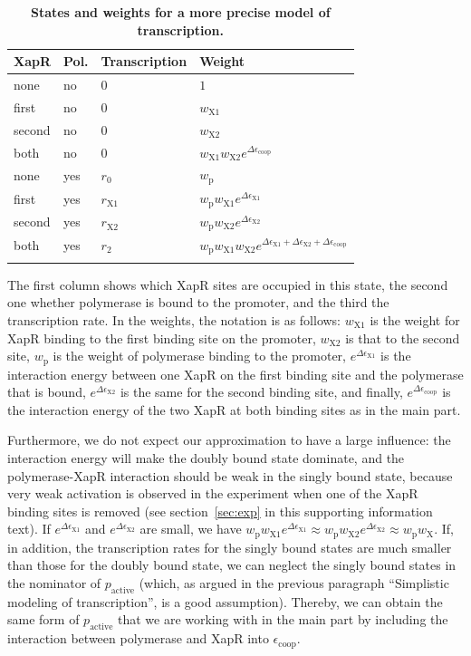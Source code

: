 \documentclass[10pt,letterpaper]{article}
\newlength\savedwidth
\newcommand\thickhline{\noalign{\global\savedwidth\arrayrulewidth\global\arrayrulewidth 2pt}%
	\hline
	\noalign{\global\arrayrulewidth\savedwidth}}
\newcommand{\n}[1]{\mathrm{#1}}
\begin{document}
\begin{table}
	\centering
	\caption{
		{\bf States and weights for a more precise model of transcription.}}
	\begin{tabular}{llll}
		\thickhline
		XapR & Pol. & Transcription & Weight \\
		\hline
		none & no & $0$ & $1$ \\
		first & no & $0$ & $w_{\n{X1}}$ \\
		second & no & $0$ & $w_{\n{X2}}$ \\
		both & no & $0$ & $w_{\n{X1}} w_{\n{X2}} e^{\Delta \epsilon_{\n{coop}}}$ \\
		none & yes & $r_0$ & $w_{\n{p}}$ \\
		first & yes & $r_{\n{X1}}$ & $w_{\n{p}} w_{\n{X1}} e^{\Delta \epsilon_{\n{X1}}}$ \\
		second & yes & $r_{\n{X2}}$ & $w_{\n{p}} w_{\n{X2}} e^{\Delta \epsilon_{\n{X2}}}$ \\
		both & yes & $r_2$ & $w_{\n{p}} w_{\n{X1}} w_{\n{X2}} e^{\Delta \epsilon_{\n{X1}} + \Delta \epsilon_{\n{X2}} + \Delta \epsilon_{\n{coop}}}$ \\
		\thickhline
	\end{tabular}
	\begin{flushleft} 
		The first column shows which XapR sites are occupied in this state, the second one whether polymerase is bound to the promoter, and the third the transcription rate. In the weights, the notation is as follows: $w_{\n{X1}}$ is the weight for XapR binding to the first binding site on the promoter, $w_{\n{X2}}$ is that to the second site, $w_{\n{p}}$ is the weight of polymerase binding to the promoter, $e^{\Delta \epsilon_{\n{X1}}}$ is the interaction energy between one XapR on the first binding site and the polymerase that is bound, $e^{\Delta \epsilon_{\n{X2}}}$ is the same for the second binding site, and finally, $e^{\Delta \epsilon_{\n{coop}}}$ is the interaction energy of the two XapR at both binding sites as in the main part.
	\end{flushleft}
	\label{tableSI1:statesPromoter}
\end{table}

Furthermore, we do not expect our approximation to have a large influence: the interaction energy will make the doubly bound state dominate, and the polymerase-XapR interaction should be weak in the singly bound state, because very weak activation is observed in the experiment when one of the XapR binding sites is removed (see section~\ref{sec:exp} in this supporting information text). If $e^{\Delta \epsilon_{\n{X1}}}$ and $e^{\Delta \epsilon_{\n{X2}}}$ are small, we have $w_{\n{p}} w_{\n{X1}} e^{\Delta \epsilon_{\n{X1}}} \approx w_{\n{p}} w_{\n{X2}} e^{\Delta \epsilon_{\n{X2}}} \approx w_{\n{p}} w_{\n{X}}$. If, in addition, the transcription rates for the singly bound states are much smaller than those for the doubly bound state, we can neglect the singly bound states in the nominator of $p_{\n{active}}$ (which, as argued in the previous paragraph ``Simplistic modeling of transcription'', is a good assumption). Thereby, we can obtain the same form of $p_{\n{active}}$ that we are working with in the main part by including the interaction between polymerase and XapR into $\epsilon_{\n{coop}}$.
\end{document}
